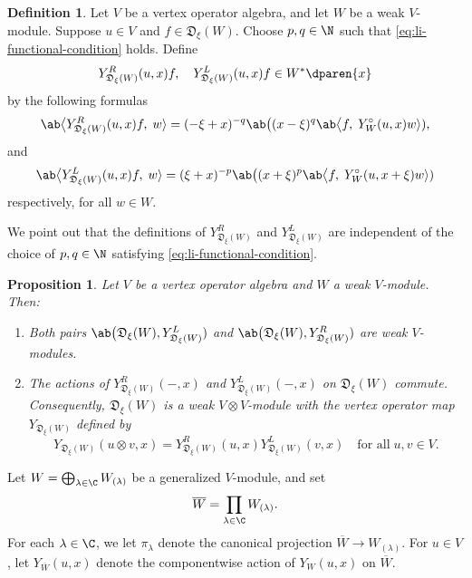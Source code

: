 \documentclass[12pt, english]{article}
\numberwithin{equation}{section}
\theoremstyle{plain}
\newtheorem{proposition}[lemma]{Proposition}
\theoremstyle{definition}
\newtheorem{definition}[lemma]{Definition}
\theoremstyle{remark}
\begin{document}
	\begin{definition}
		Let $V$ be a vertex operator algebra, and let $W$ be a weak $V$-module.
		Suppose $u \in V$ and $f \in \mathfrak{D}_{\xi}(W)$.   Choose  $p, q \in \N$ such that  \eqref{eq:li-functional-condition}  holds.
		Define
		\[
		Y^{R}_{ \mathfrak{D}_{\xi}(W) }(u, x) f, \quad
		Y^{L}_{ \mathfrak{D}_{\xi}(W) }(u, x) f \in W^*\dparen{x}
		\]
		by the following formulas
		\[
		\ab\big \langle Y^{R}_{ \mathfrak{D}_{\xi}(W) }(u, x) f, \; w\rangle
		= (-\xi+x)^{-q} \ab\big((x-\xi)^q \ab\big \langle f, \; Y^\circ_W(u, x) w\rangle),
		\]
		and
		\[
		\ab\big \langle Y^{L}_{ \mathfrak{D}_{\xi}(W) }(u, x) f, \; w\rangle
		= (\xi+x)^{-p} \ab\big((x+\xi)^p \ab\big \langle f, \; Y^\circ_W(u, x+\xi) w\rangle)
		\]
		respectively,  for all $w \in W$.
	\end{definition}
	
	We point out that the definitions of $Y^{R}_{ \mathfrak{D}_{\xi}(W) }$ and $Y^{L}_{ \mathfrak{D}_{\xi}(W) }$
	are independent of the choice of $p, q \in \N$ satisfying \eqref{eq:li-functional-condition}.
	
	\begin{proposition}\cite{Li02} \label{prop:li-commuting-actions}
		Let $V$ be a vertex operator algebra and $W$ a weak $V$-module. Then:
		\begin{enumerate}[label=(\arabic*),ref=\arabic*]
			\item Both pairs
			$\ab\big(\mathfrak{D}_{\xi}(W), Y^{L}_{ \mathfrak{D}_{\xi}(W) })$ and $\ab\big(\mathfrak{D}_{\xi}(W), Y^{R}_{ \mathfrak{D}_{\xi}(W) })$
			are weak $V$-modules.
			
			\item The actions of $Y^{R}_{\mathfrak{D}_{\xi}(W)}(-, x)$ and $Y^{L}_{\mathfrak{D}_{\xi}(W)}(-, x)$ on $\mathfrak{D}_{\xi}(W)$ commute.
			Consequently, $\mathfrak{D}_{\xi}(W)$ is a weak $V \otimes V$-module with the vertex operator map $Y_{\mathfrak{D}_{\xi}(W)}$ defined
			by
			\[
			Y_{\mathfrak{D}_{\xi}(W)}(u \otimes v, x) = Y^{R}_{\mathfrak{D}_{\xi}(W)}(u, x) Y^{L}_{\mathfrak{D}_{\xi}(W)}(v, x) \quad \text{for all} \; u, v \in V.
			\]
		\end{enumerate}
		
	\end{proposition}
	
	Let $W = \bigoplus_{\lambda \in \C} W_{(\lambda)}$ be a generalized $V$-module, and set
	\[
	\overline{W} = \prod_{\lambda \in \C} W_{(\lambda)}.
	\]
	For each $\lambda \in \C$, we let $\pi_\lambda$ denote the canonical projection $\overline{W} \to W_{(\lambda)}$.
	For $u \in V$, let $Y_{\overline{W}}(u, x)$ denote the componentwise action of $Y_W(u, x)$ on $\overline{W}$.
	
\end{document}
